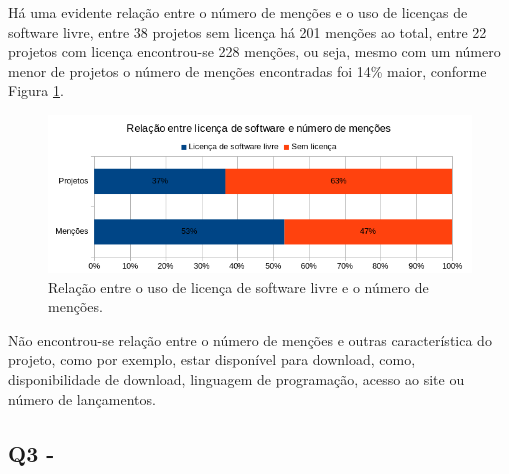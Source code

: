 Há uma evidente relação entre o número de menções e o uso de licenças de
software livre, entre 38 projetos sem licença há 201 menções ao total, entre 22
projetos com licença encontrou-se 228 menções, ou seja, mesmo com um número menor de
projetos o número de menções encontradas foi 14\% maior, conforme Figura \ref{license-vs-mentions}.

\begin{figure}[h]
  \center
  \includegraphics[scale=0.6]{imagens/license-vs-mentions.png}
  \caption{Relação entre o uso de licença de software livre e o número de menções.}
  \label{license-vs-mentions}
\end{figure}

Não encontrou-se relação entre o número de menções e outras característica do
projeto, como por exemplo, estar disponível para download, como,
disponibilidade de download, linguagem de programação, acesso ao site ou número
de lançamentos.

%

\subsection{Q3 - \QuestaoTres} %


